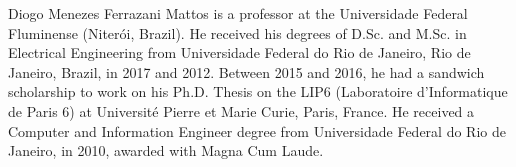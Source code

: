 \documentclass{ieeeaccess}
\begin{document}
\begin{IEEEbiography}{Diogo Menezes Ferrazani Mattos} is a professor at the Universidade Federal Fluminense (Niterói, Brazil). He received his degrees of D.Sc. and M.Sc. in Electrical Engineering from Universidade Federal do Rio de Janeiro, Rio de Janeiro, Brazil, in 2017 and 2012. Between 2015 and 2016, he had a sandwich scholarship to work on his Ph.D. Thesis on the LIP6 (Laboratoire d’Informatique de Paris 6) at Université Pierre et Marie Curie, Paris, France. He received a Computer and Information Engineer degree from Universidade Federal do Rio de Janeiro, in 2010, awarded with Magna Cum Laude.
\end{IEEEbiography}
\vfill
\EOD
\end{document}
